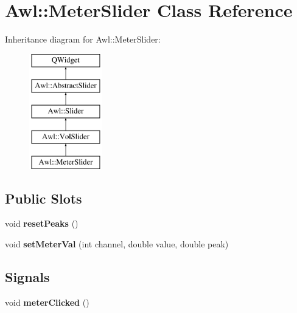 \hypertarget{class_awl_1_1_meter_slider}{}\section{Awl\+:\+:Meter\+Slider Class Reference}
\label{class_awl_1_1_meter_slider}
Inheritance diagram for Awl\+:\+:Meter\+Slider\+:\begin{figure}[H]
\begin{center}
\leavevmode
\includegraphics[height=5.000000cm]{class_awl_1_1_meter_slider}
\end{center}
\end{figure}
\subsection*{Public Slots}
\begin{DoxyCompactItemize}
\item 
\mbox{\label{class_awl_1_1_meter_slider_ae4ccb6a711edc79537fddadfdaf236cd}} 
void {\bfseries reset\+Peaks} ()
\item 
\mbox{\label{class_awl_1_1_meter_slider_a0f907b73d5e51729157960d229707935}} 
void {\bfseries set\+Meter\+Val} (int channel, double value, double peak)
\end{DoxyCompactItemize}
\subsection*{Signals}
\begin{DoxyCompactItemize}
\item 
\mbox{\label{class_awl_1_1_meter_slider_a7568b9447e8549a98e25ccdf31de47e4}} 
void {\bfseries meter\+Clicked} ()
\end{DoxyCompactItemize}
